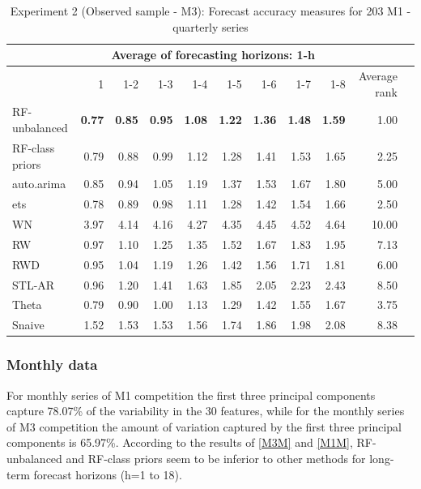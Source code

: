 \documentclass[11pt,a4paper,]{article}
\theoremstyle{definition}
\theoremstyle{definition}
\theoremstyle{definition}
\theoremstyle{remark}
\begin{document}
\begin{table}[!h]
\centering
\caption{Experiment 2 (Observed sample - M3): Forecast accuracy measures for 203 M1 - quarterly series}
\label{M1Q}
\begin{tabular}{lrrrrrrrrrl}
\hline
 & \multicolumn{8}{c}{Average of forecasting horizons: 1-h}    &  \\ \hline
 &  1& 1-2 & 1-3 & 1-4 & 1-5 & 1-6 & 1-7 & 1-8  & Average rank  \\ \hline
 RF-unbalanced& \bf{0.77} & \bf{0.85} & \bf{0.95} & \bf{1.08} & \bf{1.22} & \bf{1.36} & \bf{1.48} & \bf{1.59} & 1.00  \\ 
RF-class priors & 0.79 &0.88  & 0.99 & 1.12 & 1.28 & 1.41 &  1.53& 1.65 &2.25    \\ 
auto.arima & 0.85 & 0.94 & 1.05 & 1.19 & 1.37 & 1.53& 1.67 & 1.80 & 5.00  \\ 
ets & 0.78 & 0.89  & 0.98 & 1.11 & 1.28 & 1.42 & 1.54 & 1.66 &  2.50  \\
WN & 3.97 & 4.14 & 4.16 & 4.27 & 4.35 & 4.45 & 4.52 & 4.64 & 10.00   \\ 
RW & 0.97 & 1.10 & 1.25 & 1.35 & 1.52 & 1.67 & 1.83 & 1.95 & 7.13  \\ 
RWD & 0.95 & 1.04 & 1.19 & 1.26 & 1.42 & 1.56 & 1.71 & 1.81 &  6.00  \\ 
STL-AR & 0.96 & 1.20 & 1.41 & 1.63 & 1.85 & 2.05 & 2.23 &  2.43 & 8.50   \\ 
Theta & 0.79 & 0.90 & 1.00 & 1.13& 1.29 & 1.42 & 1.55 &  1.67 &  3.75 \\ 
Snaive & 1.52 & 1.53 & 1.53 & 1.56 & 1.74 & 1.86 & 1.98 & 2.08 & 8.38   \\ \hline
\end{tabular}
\end{table}

\subsubsection{Monthly data}\label{monthly-data}

For monthly series of M1 competition the first three principal
components capture 78.07\% of the variability in the 30 features, while
for the monthly series of M3 competition the amount of variation
captured by the first three principal components is 65.97\%. According
to the results of \autoref{M3M} and \autoref{M1M}, RF-unbalanced and
RF-class priors seem to be inferior to other methods for long-term
forecast horizons (h=1 to 18).
\end{document}
